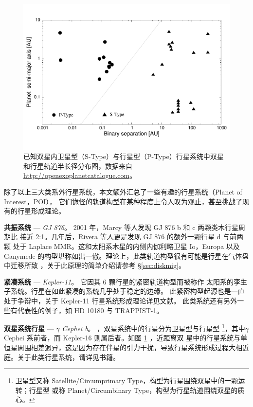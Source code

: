 \begin{figure}[b]
\centering
\includegraphics[width=1.0\textwidth]{figures/chapter1/fig14_binaryplanet.pdf}
\caption{已知双星内卫星型（S-Type）与行星型（P-Type）行星系统中双星和行星轨道半长径分布图，数据来自 \url{http://openexoplanetcatalogue.com}。}
\label{fig:pibinary}
\end{figure}

除了以上三大类系外行星系统，本文额外汇总了一些有趣的行星系统（Planet of Interest，POI），
它们诡怪的轨道构型在某种程度上令人叹为观止，甚至挑战了现有的行星形成理论。

\textbf{共振系统} --- \textit{GJ 876}。  {} 2001 年，Marcy 等人发现 GJ 876 b 和 c 两颗类木行星周期比
接近 2:1\cite{Marcy2001}。几年后，Rivera 等人更是发现 GJ 876 的额外一颗行星 d 与前两颗
处于 Laplace MMR\cite{Rivera2010}。这和太阳系木星的内侧内伽利略卫星 Io，Europa 以及 
Ganymede 的构型堪称如出一辙。理论上，此类轨道构型很有可能是行星在气体盘中迁移所致
\cite{KleyNelson2012,ZhangZhou2010}，关于此原理的简单介绍请参考 \S \ref{sec:diskmig}。

\textbf{紧凑系统} --- \textit{Kepler-11}。  {} 它因其 6 颗行星的紧密轨道构型\cite{Lissauer2011}而被称作
太阳系的孪生子系统\cite{Zhou2012}。行星在如此紧凑的系统几乎处于稳定的边缘\cite{Mahajan2014}。
此紧密构型起源也是一直处于争辩中，关于 Kepler-11 行星系统形成理论详见文献。
此类系统还有另外一些有代表性的例子，如 HD 10180\cite{Lovis2011} 与 TRAPPIST-1\cite{Gillon2017}。

\textbf{双星系统行星} --- \textit{$\gamma$ Cephei b}。  {} ，双星系统中的行星分为卫星型与行星型
\footnote{卫星型又称 Satellite/Circumprimary Type，构型为行星围绕双星中的一颗运转；行星型
或称 Planet/Circumbinary Type，构型为行星轨道围绕双星的质心。}，其中$\gamma$ Cephei
\cite{Hatzes2003} 系前者，而 Kepler-16\cite{Doyle2011} 则属后者。如图 \ref{fig:pibinary} ，近距离双
星中的行星系统与单恒星周围相差迥异，这是因为存在伴星的引力干扰，导致行星系统形成过程大相近
庭。关于此类行星系统，请详见书籍。

